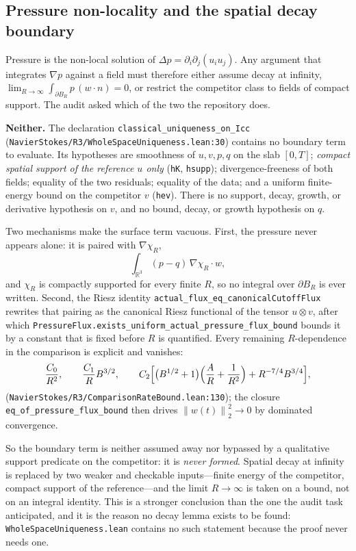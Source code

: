 \documentclass[11pt]{article}
\newcommand{\R}{\mathbb{R}}
\newcommand{\norm}[1]{\left\lVert #1\right\rVert}
\newcommand{\ct}[1]{\texttt{#1}}
\newcommand{\file}[1]{\texttt{\small #1}}
\theoremstyle{plain}
\theoremstyle{definition}
\theoremstyle{remark}
\begin{document}
\subsection{Pressure non-locality and the spatial decay boundary}
\label{sec:riesz-decay}

Pressure is the non-local solution of $\Delta p=\partial_i\partial_j(u_iu_j)$.
Any argument that integrates $\nabla p$ against a field must therefore either
assume decay at infinity,
$\lim_{R\to\infty}\int_{\partial B_R}p\,(w\cdot n)=0$, or restrict the
competitor class to fields of compact support. The audit asked which of the two
the repository does.

\textbf{Neither.} The declaration \ct{classical\_uniqueness\_on\_Icc}
(\file{NavierStokes/R3/WholeSpaceUniqueness.lean:30}) contains no boundary term
to evaluate. Its hypotheses are smoothness of $u,v,p,q$ on the slab $[0,T]$;
\emph{compact spatial support of the reference $u$ only} (\ct{hK},
\ct{hsupp}); divergence-freeness of both fields; equality of the two residuals;
equality of the data; and a uniform finite-energy bound on the competitor $v$
(\ct{hev}). There is no support, decay, growth, or derivative hypothesis on $v$,
and no bound, decay, or growth hypothesis on $q$.

Two mechanisms make the surface term vacuous. First, the pressure never appears
alone: it is paired with $\nabla\chi_R$,
\[
  \int_{\R^3}(p-q)\,\nabla\chi_R\cdot w ,
\]
and $\chi_R$ is compactly supported for every finite $R$, so no integral over
$\partial B_R$ is ever written. Second, the Riesz identity
\ct{actual\_flux\_eq\_canonicalCutoffFlux} rewrites that pairing as the canonical
Riesz functional of the tensor $u\otimes v$, after which
\ct{PressureFlux.exists\_uniform\_actual\_pressure\_flux\_bound} bounds it by a
constant that is fixed before $R$ is quantified. Every remaining $R$-dependence
in the comparison is explicit and vanishes:
\[
  \frac{C_0}{R^2},\qquad \frac{C_1}{R}B^{3/2},\qquad
  C_2\Bigl[\bigl(B^{1/2}+1\bigr)\Bigl(\frac{A}{R}+\frac1{R^2}\Bigr)
  +R^{-7/4}B^{3/4}\Bigr],
\]
(\file{NavierStokes/R3/ComparisonRateBound.lean:130}); the closure
\ct{eq\_of\_pressure\_flux\_bound} then drives $\norm{w(t)}_2^2\to0$ by
dominated convergence.

So the boundary term is neither assumed away nor bypassed by a qualitative
support predicate on the competitor: it is \emph{never formed}. Spatial decay at
infinity is replaced by two weaker and checkable inputs---finite energy of the
competitor, compact support of the reference---and the limit $R\to\infty$ is
taken on a bound, not on an integral identity. This is a stronger conclusion
than the one the audit task anticipated, and it is the reason no decay lemma
exists to be found: \file{WholeSpaceUniqueness.lean} contains no such statement
because the proof never needs one.
\end{document}
